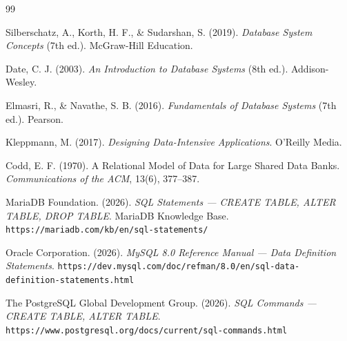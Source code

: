 \documentclass[11pt,a4paper]{article}
\begin{document}
\begin{thebibliography}{99}

	Silberschatz, A., Korth, H. F., \& Sudarshan, S. (2019).
	\textit{Database System Concepts} (7th ed.).
	McGraw-Hill Education.

	Date, C. J. (2003).
	\textit{An Introduction to Database Systems} (8th ed.).
	Addison-Wesley.

	Elmasri, R., \& Navathe, S. B. (2016).
	\textit{Fundamentals of Database Systems} (7th ed.).
	Pearson.

	Kleppmann, M. (2017).
	\textit{Designing Data-Intensive Applications}.
	O'Reilly Media.

	Codd, E. F. (1970).
	A Relational Model of Data for Large Shared Data Banks.
	\textit{Communications of the ACM}, 13(6), 377--387.

	MariaDB Foundation. (2026).
	\textit{SQL Statements --- CREATE TABLE, ALTER TABLE, DROP TABLE}.
	MariaDB Knowledge Base.
	\texttt{https://mariadb.com/kb/en/sql-statements/}

	Oracle Corporation. (2026).
	\textit{MySQL 8.0 Reference Manual --- Data Definition Statements}.
	\texttt{https://dev.mysql.com/doc/refman/8.0/en/sql-data-definition-statements.html}

	The PostgreSQL Global Development Group. (2026).
	\textit{SQL Commands --- CREATE TABLE, ALTER TABLE}.
	\texttt{https://www.postgresql.org/docs/current/sql-commands.html}

\end{thebibliography}
\end{document}
